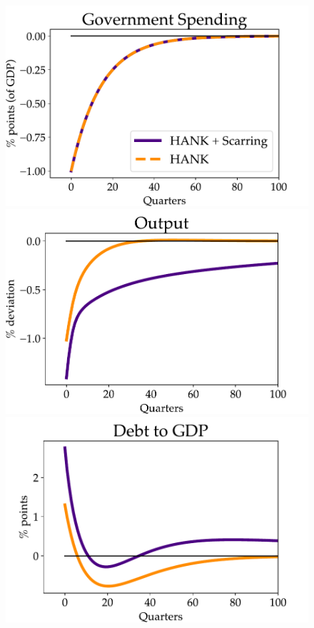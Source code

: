 \begin{figure}[!t]
\begin{center}
\begin{minipage}{0.5\textwidth}
\includegraphics[scale=.5]{text/Chapter1/Figures/Fiscal_Consolidation/Government_spending_FC}
\end{minipage}\hspace*{\fill}
\begin{minipage}{0.5\textwidth}
\includegraphics[scale=.5]{text/Chapter1/Figures/Fiscal_Consolidation/Output_FC}
\end{minipage}
\medskip
\begin{minipage}{0.5\textwidth}
\includegraphics[scale=.5]{text/Chapter1/Figures/Fiscal_Consolidation/debt to GDP_FC}

\end{minipage}
\end{center}
\end{figure}
